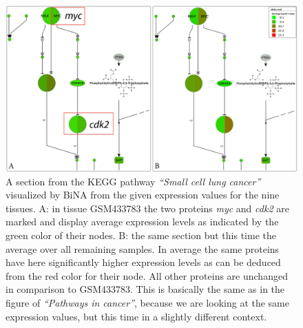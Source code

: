 
\begin{figure}[Htbp]
 \centering
 \includegraphics[scale=0.7]{./img/sclc_scaled.png}
 \caption{A section from the KEGG pathway \textit{``Small cell lung cancer''}
visualized by BiNA from the given expression values for the nine tissues. A:
in tissue GSM433783 the two proteins \textit{myc} and \textit{cdk2} are marked
and display average expression levels as indicated by the green color of their
nodes. B: the same section but this time the average over all remaining
samples. In average the same proteins have here significantly higher expression
levels as can be deduced from the red color for their node. All other proteins
are unchanged in comparison to GSM433783. This is basically the same as in the
figure of \textit{``Pathways in cancer''}, because we are looking at the same
expression values, but this time in a slightly different context.}
 \label{fig:SCLC}
\end{figure}

